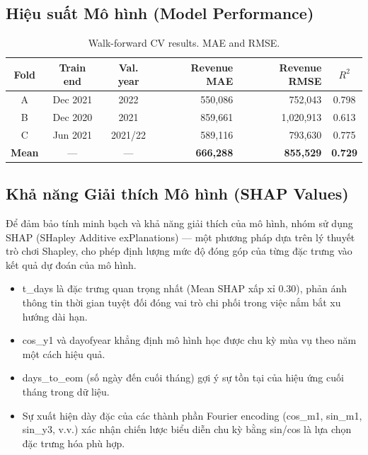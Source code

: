\documentclass{article}
\begin{document}
\subsection{Hiệu suất Mô hình (Model Performance)}

\begin{table}[htbp]
\centering
\caption{Walk-forward CV results. MAE and RMSE.}
\renewcommand{\arraystretch}{1.2} 
\begin{tabular}{@{} c c c r r c @{}}
\toprule
\textbf{Fold} & \textbf{Train end} & \textbf{Val. year} & \textbf{Revenue MAE} & \textbf{Revenue RMSE} & \textbf{$R^2$} \\
\midrule
A & Dec 2021 & 2022    & 550,086 & 752,043   & 0.798 \\
B & Dec 2020 & 2021    & 859,661 & 1,020,913 & 0.613 \\
C & Jun 2021 & 2021/22 & 589,116 & 793,630   & 0.775 \\
\midrule
\textbf{Mean} & --- & --- & \textbf{666,288} & \textbf{855,529} & \textbf{0.729} \\
\bottomrule
\end{tabular}
\end{table}

\FloatBarrier 

\subsection{Khả năng Giải thích Mô hình (SHAP Values)}

Để đảm bảo tính minh bạch và khả năng giải thích của mô hình, nhóm sử dụng SHAP (SHapley Additive exPlanations) — một phương pháp dựa trên lý thuyết trò chơi Shapley, cho phép định lượng mức độ đóng góp của từng đặc trưng vào kết quả dự đoán của mô hình.

\begin{itemize}
    \item t\_days là đặc trưng quan trọng nhất (Mean SHAP xấp xỉ 0.30), phản ánh thông tin thời gian tuyệt đối đóng vai trò chi phối trong việc nắm bắt xu hướng dài hạn.
    \item cos\_y1 và dayofyear khẳng định mô hình học được chu kỳ mùa vụ theo năm một cách hiệu quả.
    \item days\_to\_eom (số ngày đến cuối tháng) gợi ý sự tồn tại của hiệu ứng cuối tháng trong dữ liệu.
    \item Sự xuất hiện dày đặc của các thành phần Fourier encoding (cos\_m1, sin\_m1, sin\_y3, v.v.) xác nhận chiến lược biểu diễn chu kỳ bằng sin/cos là lựa chọn đặc trưng hóa phù hợp.
\end{itemize}
\end{document}

